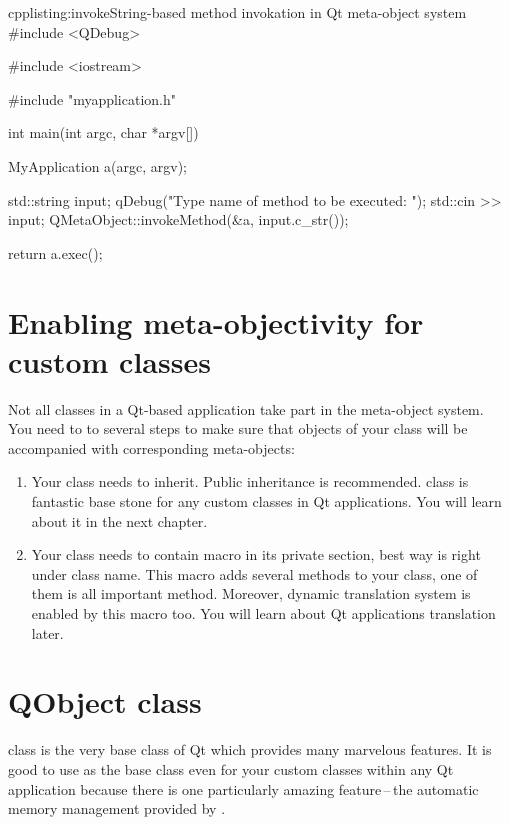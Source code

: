 \begin{fdoccode}{cpp}{listing:invoke}{String-based method invokation in Qt meta-object system}
#include <QDebug>

#include <iostream>

#include "myapplication.h"


int main(int argc, char *argv[]){
    MyApplication a(argc, argv);
    
    std::string input;
    qDebug("Type name of method to be executed: ");
    std::cin >> input;
    QMetaObject::invokeMethod(&a, input.c_str());

    return a.exec();
}
\end{fdoccode}

\section{Enabling meta-objectivity for custom classes}
Not all classes in a Qt-based application take part in the meta-object system. You need to to several steps to make sure that objects of your class will be accompanied with corresponding meta-objects:

\begin{enumerate}
\item Your class needs to inherit. Public inheritance is recommended. class is fantastic base stone for any custom classes in Qt applications. You will learn about it in the next chapter.
\item Your class needs to contain macro in its private section, best way is right under class name. This macro adds several methods to your class, one of them is all important method. Moreover, dynamic translation system is enabled by this macro too. You will learn about Qt applications translation later.
\end{enumerate}

\section{QObject class}
 class is the very base class of Qt which provides many marvelous features. It is good to use as the base class even for your custom classes within any Qt application because there is one particularly amazing feature\,--\,the automatic memory management provided by .

